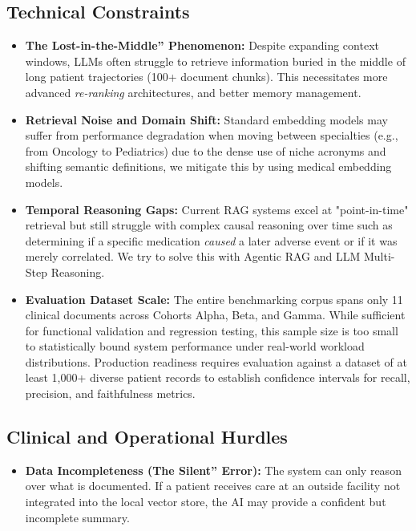 \subsection{Technical Constraints}
\begin{itemize}
    \item \textbf{The Lost-in-the-Middle'' Phenomenon:} Despite expanding context windows, LLMs often struggle to retrieve information buried in the middle of long patient trajectories (100+ document chunks). This necessitates more advanced \textit{re-ranking} architectures, and better memory management.
    \item \textbf{Retrieval Noise and Domain Shift:} Standard embedding models may suffer from performance degradation when moving between specialties (e.g., from Oncology to Pediatrics) due to the dense use of niche acronyms and shifting semantic definitions, we mitigate this by using medical embedding models.
    \item \textbf{Temporal Reasoning Gaps:} Current RAG systems excel at "point-in-time" retrieval but still struggle with complex causal reasoning over time such as determining if a specific medication \textit{caused} a later adverse event or if it was merely correlated. We try to solve this with Agentic RAG and LLM Multi-Step Reasoning.
    \item \textbf{Evaluation Dataset Scale:} The entire benchmarking corpus spans only 11 clinical documents across Cohorts Alpha, Beta, and Gamma. While sufficient for functional validation and regression testing, this sample size is too small to statistically bound system performance under real-world workload distributions. Production readiness requires evaluation against a dataset of at least 1,000+ diverse patient records to establish confidence intervals for recall, precision, and faithfulness metrics.
\end{itemize}

\subsection{Clinical and Operational Hurdles}
\begin{itemize}
    \item \textbf{Data Incompleteness (The Silent'' Error):} The system can only reason over what is documented. If a patient receives care at an outside facility not integrated into the local vector store, the AI may provide a confident but incomplete summary.
\end{itemize}

